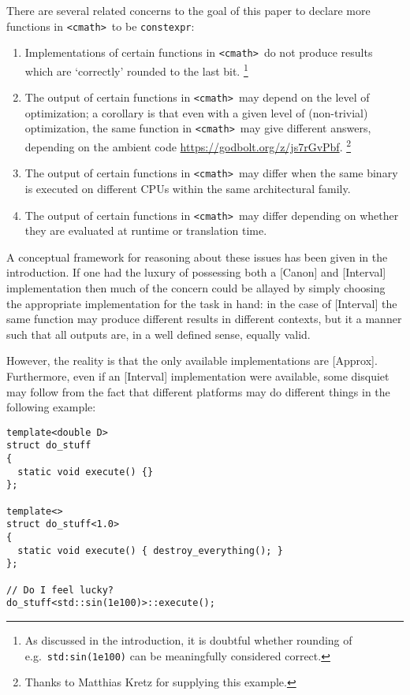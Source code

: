 \documentclass[prd,twocolumn,amsmath,amssymb,nofootinbib,eqsecnum]{revtex4-1}
\newcommand{\constexpr}{\code{constexpr}\xspace}
\newcommand{\code}[1]{{\tt #1}}
\newcommand{\header}[1]{{\tt <#1>}}
\newcommand{\cmath}{\header{cmath}}
\begin{document}
There are several related concerns to the goal of this paper to declare more functions in \cmath\ to be \constexpr:
\begin{enumerate}
	\item Implementations of certain functions in \cmath\ do not produce results which are `correctly' rounded to the last bit.%
	\footnote{As discussed in the introduction, it is doubtful whether rounding of e.g.\ \code{std:sin(1e100)} can be meaningfully considered correct.}
	
	\item The output of certain functions in \cmath\ may depend on the level of optimization; a corollary
	is that even with a given level of (non-trivial) optimization, the same function in \cmath\ may give 
	different answers, depending on the ambient 
	code \href{https://godbolt.org/z/js7rGvPbf}{https://godbolt.org/z/js7rGvPbf}.%
	\footnote{Thanks to Matthias Kretz for supplying this example.}
	
	\item The output of certain functions in \cmath\ may differ when the same binary is executed on
	different CPUs within the same architectural family.
		
	\item The output of certain functions in \cmath\ may differ depending on whether they are evaluated at runtime or translation time.
\end{enumerate}

A conceptual framework for reasoning about these issues has been given in the introduction. If one had the luxury of possessing both a [Canon] and [Interval] implementation then much of the concern could be allayed by simply choosing the appropriate implementation for the task in hand: in the case of [Interval] the same function may produce different results in different contexts, but it a manner such that all outputs are, in a well defined sense, equally valid.

However, the reality is that the only available implementations are [Approx]. Furthermore, even if an [Interval] implementation were available, some disquiet may follow from the fact that different platforms
may do different things in the following example:
\begin{verbatim}
template<double D>
struct do_stuff
{
  static void execute() {}
};

template<>
struct do_stuff<1.0>
{
  static void execute() { destroy_everything(); }
};

// Do I feel lucky?
do_stuff<std::sin(1e100)>::execute();
\end{verbatim}
\end{document}
